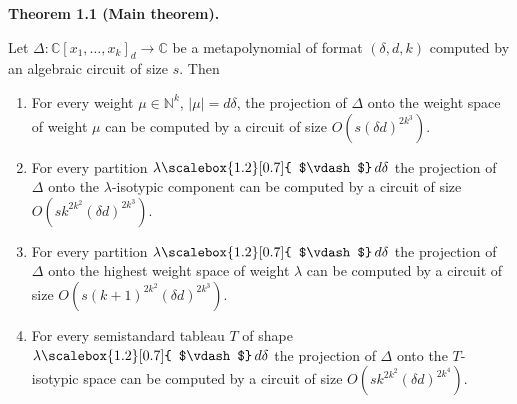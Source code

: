 

\par\medskip\noindent\textbf{Theorem 1.1 (Main theorem).}\par



Let $\Delta\colon\mathbb{C}[x_{1},\dots,x_{k}]_{d}\to\mathbb{C}$ be a metapolynomial of format $(\delta,d,k)$ computed by an algebraic circuit of size $s$.
Then



\begin{enumerate}


\item 
 


For every weight $\mu\in\mathbb{N}^{k}$, $|\mu|=d\delta$, the projection of $\Delta$ onto the weight space of weight $\mu$ can be computed by a circuit of size $O(s(\delta d)^{2k^{3}})$.





\item 
 


For every partition $\lambda\mathchoice{\scalebox{1.2}[0.7]{ $\vdash$}\,}{\scalebox{1.2}[0.7]{ $\vdash$}\,}{\scalebox{0.7}{\scalebox{1.2}[0.7]{$\vdash$}}\,}{\scalebox{0.5}{\scalebox{1.2}[0.7]{$\vdash$}}\,}d\delta$ the projection of $\Delta$ onto the $\lambda$-isotypic component can be computed by a circuit of size $O(sk^{2k^{2}}(\delta d)^{2k^{3}})$.





\item 
 


For every partition $\lambda\mathchoice{\scalebox{1.2}[0.7]{ $\vdash$}\,}{\scalebox{1.2}[0.7]{ $\vdash$}\,}{\scalebox{0.7}{\scalebox{1.2}[0.7]{$\vdash$}}\,}{\scalebox{0.5}{\scalebox{1.2}[0.7]{$\vdash$}}\,}d\delta$ the projection of $\Delta$ onto the highest weight space of weight $\lambda$ can be computed by a circuit of size $O(s(k+1)^{2k^{2}}(\delta d)^{2k^{3}})$.





\item 
 


For every semistandard tableau $T$ of shape $\lambda\mathchoice{\scalebox{1.2}[0.7]{ $\vdash$}\,}{\scalebox{1.2}[0.7]{ $\vdash$}\,}{\scalebox{0.7}{\scalebox{1.2}[0.7]{$\vdash$}}\,}{\scalebox{0.5}{\scalebox{1.2}[0.7]{$\vdash$}}\,}d\delta$ the projection of $\Delta$ onto the $T$-isotypic space can be computed by a circuit of size $O(sk^{2k^{2}}(\delta d)^{2k^{4}})$.





\end{enumerate}



